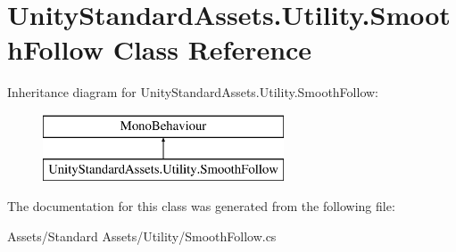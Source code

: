 \hypertarget{class_unity_standard_assets_1_1_utility_1_1_smooth_follow}{}\section{Unity\+Standard\+Assets.\+Utility.\+Smooth\+Follow Class Reference}
\label{class_unity_standard_assets_1_1_utility_1_1_smooth_follow}
Inheritance diagram for Unity\+Standard\+Assets.\+Utility.\+Smooth\+Follow\+:\begin{figure}[H]
\begin{center}
\leavevmode
\includegraphics[height=2.000000cm]{class_unity_standard_assets_1_1_utility_1_1_smooth_follow}
\end{center}
\end{figure}


The documentation for this class was generated from the following file\+:\begin{DoxyCompactItemize}
\item 
Assets/\+Standard Assets/\+Utility/Smooth\+Follow.\+cs\end{DoxyCompactItemize}
